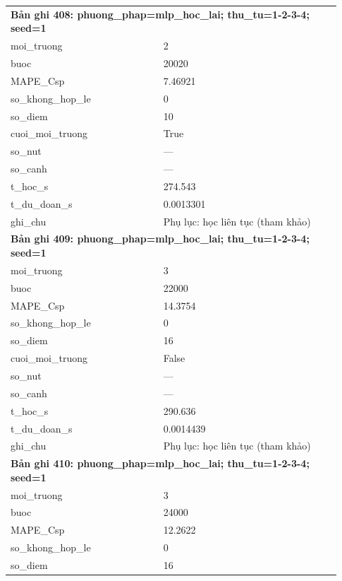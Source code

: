 \begin{longtable}{p{0.43\linewidth}p{0.50\linewidth}}
\midrule
\multicolumn{2}{p{0.95\linewidth}}{\textbf{Bản ghi 408: phuong\_phap=mlp\_hoc\_lai; thu\_tu=1-2-3-4; seed=1}} \\
moi\_\allowbreak truong & 2 \\
buoc & 20020 \\
MAPE\_\allowbreak Csp & 7.46921 \\
so\_\allowbreak khong\_\allowbreak hop\_\allowbreak le & 0 \\
so\_\allowbreak diem & 10 \\
cuoi\_\allowbreak moi\_\allowbreak truong & True \\
so\_\allowbreak nut & — \\
so\_\allowbreak canh & — \\
t\_\allowbreak hoc\_\allowbreak s & 274.543 \\
t\_\allowbreak du\_\allowbreak doan\_\allowbreak s & 0.0013301 \\
ghi\_\allowbreak chu & Phụ lục: học liên tục (tham khảo) \\
\midrule
\multicolumn{2}{p{0.95\linewidth}}{\textbf{Bản ghi 409: phuong\_phap=mlp\_hoc\_lai; thu\_tu=1-2-3-4; seed=1}} \\
moi\_\allowbreak truong & 3 \\
buoc & 22000 \\
MAPE\_\allowbreak Csp & 14.3754 \\
so\_\allowbreak khong\_\allowbreak hop\_\allowbreak le & 0 \\
so\_\allowbreak diem & 16 \\
cuoi\_\allowbreak moi\_\allowbreak truong & False \\
so\_\allowbreak nut & — \\
so\_\allowbreak canh & — \\
t\_\allowbreak hoc\_\allowbreak s & 290.636 \\
t\_\allowbreak du\_\allowbreak doan\_\allowbreak s & 0.0014439 \\
ghi\_\allowbreak chu & Phụ lục: học liên tục (tham khảo) \\
\midrule
\multicolumn{2}{p{0.95\linewidth}}{\textbf{Bản ghi 410: phuong\_phap=mlp\_hoc\_lai; thu\_tu=1-2-3-4; seed=1}} \\
moi\_\allowbreak truong & 3 \\
buoc & 24000 \\
MAPE\_\allowbreak Csp & 12.2622 \\
so\_\allowbreak khong\_\allowbreak hop\_\allowbreak le & 0 \\
so\_\allowbreak diem & 16 \\

\end{longtable}
